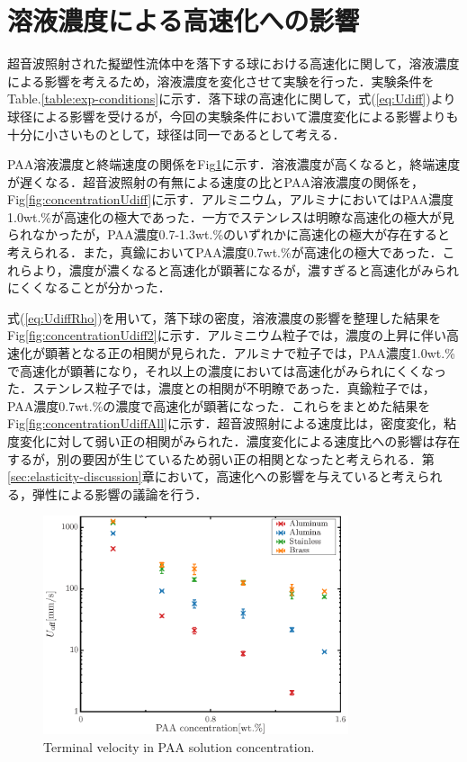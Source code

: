 \section{溶液濃度による高速化への影響}
\label{sec:concentration}
超音波照射された擬塑性流体中を落下する球における高速化に関して，溶液濃度による影響を考えるため，溶液濃度を変化させて実験を行った．実験条件をTable.\ref{table:exp-conditions}に示す．落下球の高速化に関して，式(\ref{eq:Udiff})より球径による影響を受けるが，今回の実験条件において濃度変化による影響よりも十分に小さいものとして，球径は同一であるとして考える．

PAA溶液濃度と終端速度の関係をFig\ref{fig:concentrationUT}に示す．溶液濃度が高くなると，終端速度が遅くなる．超音波照射の有無による速度の比とPAA溶液濃度の関係を，Fig\ref{fig:concentrationUdiff}に示す．アルミニウム，アルミナにおいてはPAA濃度1.0wt.\%が高速化の極大であった．一方でステンレスは明瞭な高速化の極大が見られなかったが，PAA濃度0.7-1.3wt.\%のいずれかに高速化の極大が存在すると考えられる．また，真鍮においてPAA濃度0.7wt.\%が高速化の極大であった．これらより，濃度が濃くなると高速化が顕著になるが，濃すぎると高速化がみられにくくなることが分かった．

式(\ref{eq:UdiffRho})を用いて，落下球の密度，溶液濃度の影響を整理した結果をFig\ref{fig:concentrationUdiff2}に示す．アルミニウム粒子では，濃度の上昇に伴い高速化が顕著となる正の相関が見られた．アルミナで粒子では，PAA濃度1.0wt.\%で高速化が顕著になり，それ以上の濃度においては高速化がみられにくくなった．ステンレス粒子では，濃度との相関が不明瞭であった．真鍮粒子では，PAA濃度0.7wt.\%の濃度で高速化が顕著になった．これらをまとめた結果をFig\ref{fig:concentrationUdiffAll}に示す．超音波照射による速度比は，密度変化，粘度変化に対して弱い正の相関がみられた．濃度変化による速度比への影響は存在するが，別の要因が生じているため弱い正の相関となったと考えられる．第\ref{sec:elasticity-discussion}章において，高速化への影響を与えていると考えられる，弾性による影響の議論を行う．

\begin{figure}[ht]
    \centering
    \includegraphics[width=0.8\textwidth]{./5-Results/concentrationUT.eps}
    \caption{Terminal velocity in PAA solution concentration.}
    \label{fig:concentrationUT}
\end{figure}

